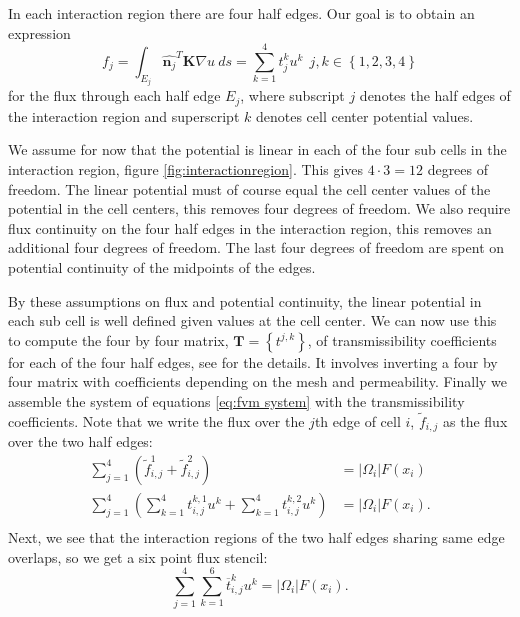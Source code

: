 \documentclass[../Main/main.tex]{subfiles}
\begin{document}
	In each interaction region there are four half edges. Our goal is to obtain an expression 
	\begin{equation*}
		f_j = \int_{E_j}\hat{\bm{n}_j}^T \bm{K} \nabla u \  ds = \sum_{k=1}^4 t^{k}_j u^k \ \ j,k \in \left \{ 1,2,3,4 \right \}
	\end{equation*}
	for the flux through each half edge $E_j$, where subscript $j$ denotes the half edges of the interaction region and superscript $k$ denotes cell center potential values.
	\par
	We assume for now that the potential is linear in each of the four sub cells in the interaction region, figure  \ref{fig:interactionregion}. This gives $4\cdot 3 = 12$ degrees of freedom. The linear potential must of course equal the cell center values of the potential in the cell centers, this removes four degrees of freedom. We also require flux continuity on the four half edges in the interaction region, this removes an additional four degrees of freedom. The last four degrees of freedom are spent on potential continuity of the midpoints of the edges. 
	\par
	By these assumptions on flux and potential continuity, the linear potential in each sub cell is well defined given values at the cell center. We can now use this to compute the four by four matrix, $\bm{T}=\left \{ t^{j,k} \right \}$,  of transmissibility coefficients  for each of the four half edges, see \cite{Aavatsmark2002} for the details. It involves inverting a four by four matrix with coefficients depending on the mesh and permeability. Finally we assemble the system of equations \eqref{eq:fvm system} with the transmissibility coefficients. Note that we write the flux over the $j$th edge of cell $i$, $\tilde{f}_{i,j}$ as the flux over the two half edges:
	\begin{equation*}
		\begin{aligned}
			\sum_{j=1}^4 (\tilde{f}_{i,j}^1 + \tilde{f}_{i,j}^2) &= |\Omega_i|F(x_i) \\
			\sum_{j=1}^4 (\sum_{k=1}^4 t^{k,1}_{i,j}u^k + \sum_{k=1}^4 t^{k,2}_{i,j}u^k)&= |\Omega_i|F(x_i).\\
		\end{aligned}
	\end{equation*}
	Next, we see that the interaction regions of the two half edges sharing same edge overlaps, so we get a six point flux stencil:
	\begin{equation*}
		\sum_{j=1}^4 \sum_{k=1}^6 \overline{t}^{k}_{i,j}u^k = |\Omega_i|F(x_i).
	\end{equation*}
\end{document}
